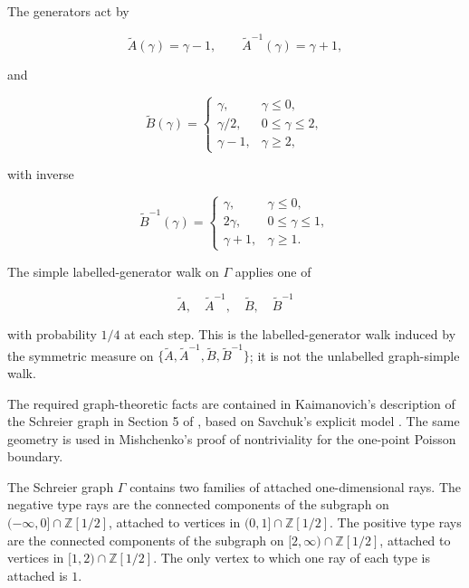 \documentclass[11pt,a4paper]{scrartcl}
\begin{document}
The generators act by

\[
\widetilde A(\gamma)=\gamma-1,
\qquad
\widetilde A^{-1}(\gamma)=\gamma+1,
\]

and

\[
\widetilde B(\gamma)=
\begin{cases}
\gamma, & \gamma\le 0,\\
\gamma/2, & 0\le \gamma\le 2,\\
\gamma-1, & \gamma\ge 2,
\end{cases}
\]

with inverse

\[
\widetilde B^{-1}(\gamma)=
\begin{cases}
\gamma, & \gamma\le 0,\\
2\gamma, & 0\le \gamma\le 1,\\
\gamma+1, & \gamma\ge 1.
\end{cases}
\]

The simple labelled-generator walk on \(\Gamma\) applies one of

\[
\widetilde A,\quad \widetilde A^{-1},\quad
\widetilde B,\quad \widetilde B^{-1}
\]

with probability \(1/4\) at each step. This is the labelled-generator walk
induced by the symmetric measure on
\(\{\widetilde A,\widetilde A^{-1},\widetilde B,\widetilde B^{-1}\}\); it is
not the unlabelled graph-simple walk.

The required graph-theoretic facts are contained in Kaimanovich's description
of the Schreier graph in Section 5 of \cite{Kaimanovich2017}, based on
Savchuk's explicit model \cite{Savchuk2010,Savchuk2015}. The same geometry is
used in Mishchenko's proof \cite{Mishchenko2015} of nontriviality for the
one-point Poisson boundary.

\begin{proposition}\label{prop:ray-decomposition}
The Schreier graph \(\Gamma\) contains
two families of attached one-dimensional rays. The negative type rays are the
connected components of the subgraph on
\((-\infty,0]\cap\mathbb Z[1/2]\), attached to vertices in
\((0,1]\cap\mathbb Z[1/2]\). The positive type rays are the connected
components of the subgraph on \([2,\infty)\cap\mathbb Z[1/2]\), attached to
vertices in \([1,2)\cap\mathbb Z[1/2]\). The only vertex to which one ray of
each type is attached is \(1\).

\end{proposition}
\end{document}
